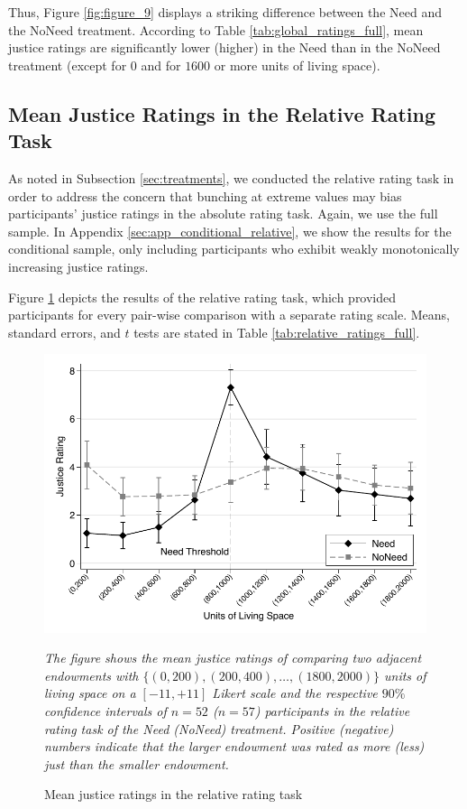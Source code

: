 \documentclass[12pt]{scrartcl}
\begin{document}
Thus, Figure \ref{fig:figure_9} displays a striking difference between the Need and the NoNeed treatment.
According to Table \ref{tab:global_ratings_full}, mean justice ratings are significantly lower (higher) in the Need than in the NoNeed treatment (except for $0$ and for $1600$ or more units of living space).


\subsection{Mean Justice Ratings in the Relative Rating Task}\label{sec:relative}
As noted in Subsection \ref{sec:treatments}, we conducted the relative rating task in order to address the concern that bunching at extreme values may bias participants' justice ratings in the absolute rating task.
Again, we use the full sample.
In Appendix \ref{sec:app_conditional_relative}, we show the results for the conditional sample, only including participants who exhibit weakly monotonically increasing justice ratings.

Figure \ref{fig:figure_10} depicts the results of the relative rating task, which provided participants for every pair-wise comparison with a separate rating scale.
Means, standard errors, and $t$ tests are stated in Table \ref{tab:relative_ratings_full}.

\begin{figure}[h]
   \centering
   \includegraphics{figures/figure_10.pdf}
   \begin{minipage}{\linewidth}
      \footnotesize
      \textit{The figure shows the mean justice ratings of comparing two adjacent endowments with $\{(0,200),(200,400),\ldots,(1800,2000)\}$ units of living space on a $[-11,+11]$ Likert scale and the respective $90\%$ confidence intervals of $n=52$ ($n=57$) participants in the relative rating task of the Need (NoNeed) treatment. Positive (negative) numbers indicate that the larger endowment was rated as more (less) just than the smaller endowment.}
   \end{minipage}
   \caption{Mean justice ratings in the relative rating task}
   \label{fig:figure_10}
\end{figure}
\end{document}
